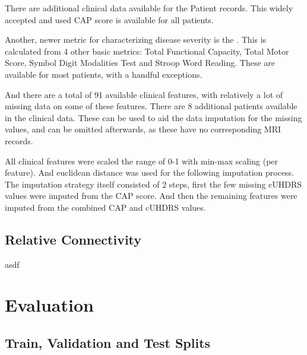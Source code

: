 There are additional clinical data available for the Patient records.  This widely accepted and used \ac{CAP} score is available for all patients.\par
Another, newer metric for characterizing disease severity is the . This is calculated from 4 other basic metrics: Total Functional Capacity, Total Motor Score, Symbol Digit Modalities Test and Stroop Word Reading. These are available for most patients, with a handful exceptions.\par
And there are a total of 91 available clinical features, with relatively a lot of missing data on some of these features. There are 8 additional patients available in the clinical data. These can be used to aid the data imputation for the missing values, and can be omitted afterwards, as these have no corresponding \ac{MRI} records.\par
All clinical features were scaled the range of 0-1 with min-max scaling (per feature). And euclidean distance was used for the following imputation process. The imputation strategy itself consisted of 2 steps, first the few missing \ac{cUHDRS} values were imputed from the \ac{CAP} score. And then the remaining features were imputed from the combined \ac{CAP} and \ac{cUHDRS} values.

\subsection{Relative Connectivity}

asdf

\section{Evaluation}

\subsection{Train, Validation and Test Splits}

